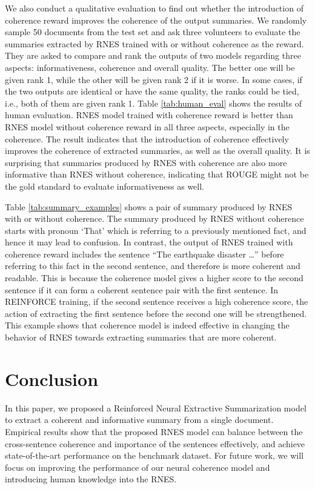 	We also conduct a qualitative evaluation to find out whether the introduction of coherence reward improves the coherence of the output summaries. We randomly sample 50 documents from the test set and ask three volunteers to evaluate the summaries extracted by RNES trained with or without coherence as the reward. They are asked to compare and rank the outputs of two models regarding three aspects: informativeness, coherence and overall quality. The better one will be given rank 1, while the other will be given rank 2 if it is worse. In some cases, if the two outputs are identical or have the same quality, the ranks could be tied, i.e., both of them are given rank 1. Table \ref{tab:human_eval} shows the results of human evaluation. RNES model trained with coherence reward is better than RNES model without coherence reward in all three aspects, especially in the coherence. The result indicates that the introduction of coherence effectively improves the coherence of extracted summaries, as well as the overall quality. It is surprising that summaries produced by RNES with coherence are also more informative than RNES without coherence, indicating that ROUGE might not be the gold standard to evaluate informativeness as well. 

	Table \ref{tab:summary_examples} shows a pair of summary produced by RNES with or without coherence. The summary produced by RNES without coherence starts with pronoun `That' which is referring to a previously mentioned fact, and hence it may lead to confusion. In contrast, the output of RNES trained with coherence reward includes the sentence ``The earthquake disaster \dots'' before referring to this fact in the second sentence, and therefore is more coherent and readable. This is because the coherence model gives a higher score to the second sentence if it can form a coherent sentence pair with the first sentence. In REINFORCE training, if the second sentence receives a high coherence score, the action of extracting the first sentence before the second one will be strengthened. This example shows that coherence model is indeed effective in changing the behavior of RNES towards extracting summaries that are more coherent.

	\section{Conclusion}	
	In this paper, we proposed a Reinforced Neural Extractive Summarization model to extract a coherent and informative summary from a single document. Empirical results show that the proposed RNES model can balance between the cross-sentence coherence and importance of the sentences effectively, and achieve state-of-the-art performance on the benchmark dataset. For future work, we will focus on improving the performance of our neural coherence model and introducing human knowledge into the RNES.    


